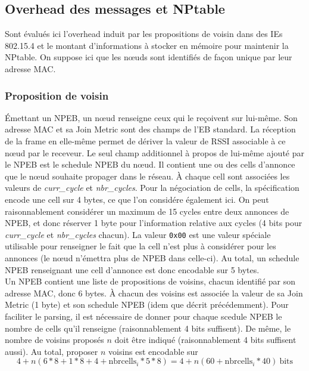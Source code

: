 \documentclass[]{report}
\begin{document}
\subsection{Overhead des messages et NPtable}

Sont évalués ici l'overhead induit par les propositions de voisin dans des IEs 802.15.4 et le montant d'informations à stocker en mémoire pour maintenir la NPtable. On suppose ici que les nœuds sont identifiés de façon unique par leur adresse MAC.

\subsubsection{Proposition de voisin}
\label{size_prop}

Émettant un NPEB, un nœud renseigne ceux qui le reçoivent sur lui-même. Son adresse MAC et sa Join Metric sont des champs de l'EB standard. La réception de la frame en elle-même permet de dériver la valeur de RSSI associable à ce nœud par le receveur. Le seul champ additionnel à propos de lui-même ajouté par le NPEB est le schedule NPEB du nœud. Il contient une ou des cells d'annonce que le nœud souhaite propager dans le réseau. À chaque cell sont associées les valeurs de \textit{curr\_cycle} et \textit{nbr\_cycles}. Pour la négociation de cells, la spécification \cite{rfc8480} encode une cell sur 4 bytes, ce que l'on considére également ici. On peut raisonnablement considérer un maximum de 15 cycles entre deux annonces de NPEB, et donc réserver 1 byte pour l'information relative aux cycles (4 bits pour \textit{curr\_cycle} et \textit{nbr\_cycles} chacun). La valeur \texttt{0x00} est une valeur spéciale utilisable pour renseigner le fait que la cell n'est plus à considérer pour les annonces (le nœud n'émettra plus de NPEB dans celle-ci). Au total, un schedule NPEB renseignant une cell d'annonce est donc encodable sur 5 bytes.\\

Un NPEB contient une liste de propositions de voisins, chacun identifié par son adresse MAC, donc 6 bytes. À chacun des voisins est associée la valeur de sa Join Metric (1 byte) et son schedule NPEB (idem que décrit précédemment). Pour faciliter le parsing, il est nécessaire de donner pour chaque scedule NPEB le nombre de cells qu'il renseigne (raisonnablement 4 bits suffisent). De même, le nombre de voisins proposés $n$ doit être indiqué (raisonnablement 4 bits suffisent aussi). Au total, proposer $n$ voisins est encodable sur
 \[ 4+n (6*8 + 1*8 + 4 + \text{nbrcells}_{i}*5*8) 
 = 4 + n(60+\text{nbrcells}_{i}*40)\ \text{bits} \]
 
\end{document}
